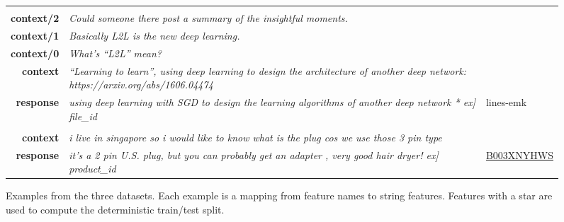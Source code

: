 \documentclass[11pt,a4paper,table]{article}
\begin{document}
\begin{figure}[htb]
    \centering
    {
        \small
        \begin{tabular}{>{\bfseries}r >{\itshape}p{100mm}}
 \\
          context/2 & Could someone there post a summary of the insightful moments. \\
          context/1 & Basically L2L is the new deep learning. \\
          context/0 & What's ``L2L'' mean? \\
          context & ``Learning to learn'', using deep learning to design the architecture of another deep network: https://arxiv.org/abs/1606.04474 \\
          response & using deep learning with SGD to design the learning algorithms of another deep network   * \1ex]
          file\_id & lines-emk \\
          \midrule
          
          
           \\
          context & i live in singapore so i would like to know what is the plug cos we use those 3 pin type \\
          response & it's a 2 pin U.S. plug, but you can probably get an adapter , very good hair dryer! \1ex]
          product\_id & \href{https://www.amazon.com/ask/questions/asin/B003XNYHWS/1/ref=ask_ql_psf_ql_hza?sort=SUBMIT_DATE&isAnswered=true}{B003XNYHWS} \\
          
\end{tabular}
        \caption{Examples from the three datasets. Each example is a mapping from feature names to string features. Features with a star  are used to compute the deterministic train/test split.}
        \label{fig:examples}
    }
\end{figure}
\end{document}
